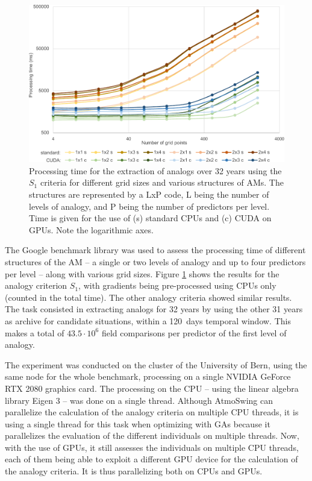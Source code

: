 \documentclass[draft]{agujournal2019}
\begin{document}
\begin{figure}
	\noindent\includegraphics[width=130mm]{figures/cuda-timing.pdf}
	\caption{Processing time for the extraction of analogs over 32 years using the $S_{1}$ criteria for different grid sizes and various structures of AMs. The structures are represented by a LxP code, L being the number of levels of analogy, and P being the number of predictors per level. Time is given for the use of (s) standard CPUs and (c) CUDA on GPUs. Note the logarithmic axes.}
	\label{cuda}
\end{figure}

The Google benchmark library was used to assess the processing time of different structures of the AM -- a single or two levels of analogy and up to four predictors per level -- along with various grid sizes. Figure \ref{cuda} shows the results for the analogy criterion $S_{1}$, with gradients being pre-processed using CPUs only (counted in the total time). The other analogy criteria showed similar results. The task consisted in extracting analogs for 32 years by using the other 31 years as archive for candidate situations, within a 120~days temporal window. This makes a total of $43.5\cdot10^6$ field comparisons per predictor of the first level of analogy.

The experiment was conducted on the cluster of the University of Bern, using the same node for the whole benchmark, processing on a single NVIDIA GeForce RTX 2080 graphics card. The processing on the CPU -- using the linear algebra library Eigen 3 \cite{Guennebaud2010} -- was done on a single thread. Although AtmoSwing can parallelize the calculation of the analogy criteria on multiple CPU threads, it is using a single thread for this task when optimizing with GAs because it parallelizes the evaluation of the different individuals on multiple threads. Now, with the use of GPUs, it still assesses the individuals on multiple CPU threads, each of them being able to exploit a different GPU device for the calculation of the analogy criteria. It is thus parallelizing both on CPUs and GPUs.
\end{document}
